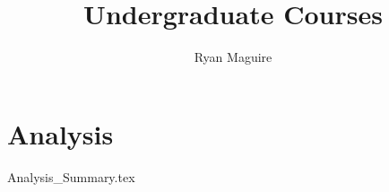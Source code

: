 \documentclass[crop=false,class=book,oneside]{standalone}
\title{Undergraduate Courses}
\author{Ryan Maguire}
\date{\vspace{-5ex}}
\begin{document}
\part{Analysis}
{Analysis_Summary.tex}
\end{document}
